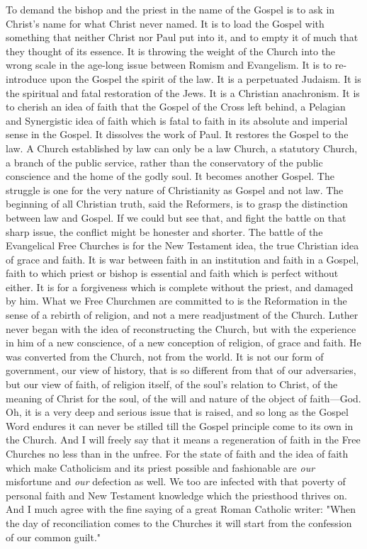 \documentclass[12pt,a5paper,twoside]{book}
\begin{document}
To demand the bishop and the priest in the name 
of the Gospel is to ask in Christ's name for what 
Christ never named. It is to load the Gospel with 
something that neither Christ nor Paul put into it, 
and to empty it of much that they thought of its 
essence. It is throwing the weight of the Church into 
the wrong scale in the age-long issue between Romism 
and Evangelism. It is to re-introduce upon the 
Gospel the spirit of the law. It is a perpetuated Judaism. 
It is the spiritual and fatal restoration of the 
Jews. It is a Christian anachronism. It is to cherish 
an idea of faith that the Gospel of the Cross left 
behind, a Pelagian and Synergistic idea of faith which 
is fatal to faith in its absolute and imperial sense in 
the Gospel. It dissolves the work of Paul. It restores 
the Gospel to the law. A Church established 
by law can only be a law Church, a statutory Church, 
a branch of the public service, rather than the conservatory 
of the public conscience and the home of 
the godly soul. It becomes another Gospel. The 
struggle is one for the very nature of Christianity as 
Gospel and not law. The beginning of all Christian 
truth, said the Reformers, is to grasp the distinction 
between law and Gospel. If we could but see that, 
and fight the battle on that sharp issue, the conflict 
might be honester and shorter. The battle of the 
Evangelical Free Churches is for the New Testament 
idea, the true Christian idea of grace and faith. It is 
war between faith in an institution and faith in a 
Gospel, faith to which priest or bishop is essential and 
faith which is perfect without either. It is for a forgiveness 
which is complete without the priest, and 
damaged by him. What we Free Churchmen are 
committed to is the Reformation in the sense of a rebirth 
of religion, and not a mere readjustment of the 
Church. Luther never began with the idea of reconstructing 
the Church, but with the experience in 
him of a new conscience, of a new conception of 
religion, of grace and faith. He was converted from 
the Church, not from the world. It is not our form 
of government, our view of history, that is so different 
from that of our adversaries, but our view of faith, of 
religion itself, of the soul's relation to Christ, of the 
meaning of Christ for the soul, of the will and nature 
of the object of faith---God. Oh, it is a very deep 
and serious issue that is raised, and so long as the 
Gospel Word endures it can never be stilled till the 
Gospel principle come to its own in the Church. 
And I will freely say that it means a regeneration of 
faith in the Free Churches no less than in the unfree. 
For the state of faith and the idea of faith 
which make Catholicism and its priest possible and 
fashionable are \textit{our} misfortune and \textit{our} defection as 
well. We too are infected with that poverty of personal 
faith and New Testament knowledge which the 
priesthood thrives on. And I much agree with the 
fine saying of a great Roman Catholic writer: 
"When the day of reconciliation comes to the 
Churches it will start from the confession of our 
common guilt." 
\end{document}
